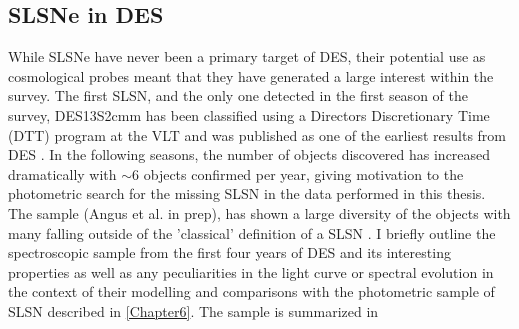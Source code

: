 \subsection{SLSNe in DES} \label{sec:DES_SLSN}
While SLSNe have never been a primary target of DES, their potential use as cosmological probes \citep{Inserra2014} meant that they have generated a large interest within the survey. The first SLSN, and the only one detected in the first season of the survey, DES13S2cmm has been classified using a Directors Discretionary Time (DTT) program at the VLT and was published as one of the earliest results from DES \citep{Papadopoulos2015}. In the following seasons, the number of objects discovered has increased dramatically with $\sim$6 objects confirmed per year, giving motivation to the photometric search for the missing SLSN in the data performed in this thesis. The sample (Angus et al. in prep), has shown a large diversity of the objects with many falling outside of the 'classical' definition of a SLSN \citep{Inserra2018}. I briefly outline the spectroscopic sample from the first four years of DES and its interesting properties as well as any peculiarities in the light curve or spectral evolution in the context of their modelling and comparisons with the photometric sample of SLSN described in \cref{Chapter6}. The sample is summarized in 

